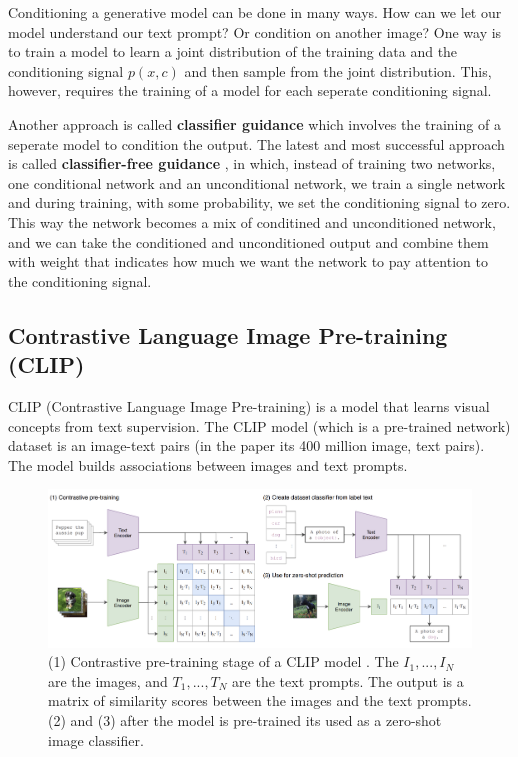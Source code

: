 \label{subsec:classifier_free_diffusion_guidance}

Conditioning a generative model can be done in many ways. How can we let our model understand our text prompt? Or condition on another image? One way is to train a model to learn a joint distribution of the training data and the conditioning signal $p(x,c)$ and then sample from the joint distribution. This, however, requires the training of a model for each seperate conditioning signal.

Another approach is called \textbf{classifier guidance} \cite{openai_diffusion_beats_gans} which involves the training of a seperate model to condition the output. The latest and most successful approach is called \textbf{classifier-free guidance} \cite{classifier_free_guidance}, in which, instead of training two networks, one conditional network and an unconditional network, we train a single network and during training, with some probability, we set the conditioning signal to zero. This way the network becomes a mix of conditined and unconditioned network, and we can take the conditioned and unconditioned output and combine them with weight that indicates how much we want the network to pay attention to the conditioning signal.






\subsection{Contrastive Language Image Pre-training (CLIP)}

\label{subsec:clip}

CLIP (Contrastive Language Image Pre-training) \cite{openai_clip} is a model that learns visual concepts from text supervision. The CLIP model (which is a pre-trained network) dataset is an image-text pairs (in the paper its 400 million image, text pairs). The model builds associations between images and text prompts. 

\begin{figure}
    \centering
    \includegraphics[width=1\textwidth]{images/diffusion_models/stable_diffusion/clip.png}
    \caption{(1) Contrastive pre-training stage of a CLIP model \cite{openai_clip}. The $I_1, ..., I_N$ are the images, and $T_1, ..., T_N$ are the text prompts. The output is a matrix of similarity scores between the images and the text prompts. (2) and (3) after the model is pre-trained its used as a zero-shot image classifier.}
    \label{fig:openai_clip}
\end{figure}


